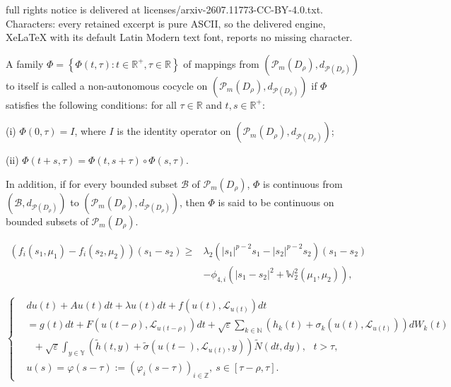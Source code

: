 \documentclass[10pt,a4paper]{amsart}
\begin{document}
full rights notice is delivered at licenses/arxiv-2607.11773-CC-BY-4.0.txt. Characters: every retained excerpt is pure ASCII, so the delivered engine, XeLaTeX with its default Latin Modern text font, reports no missing character.
\begin{definition}\label{def_ds}
  A family $\Phi =
                           \left\{\Phi(t, \tau): t \in \mathbb{R}^+, \tau \in \mathbb{R}
                           \right\}$
  of mappings from $\left( \mathcal{P}_m(D_{\rho}), d_{\mathcal{P}(D_{\rho})} \right)$
  to itself %
  is called a non-autonomous cocycle on $\left( \mathcal{P}_m(D_{\rho}), d_{\mathcal{P}(D_{\rho})} \right)$
  if $ \Phi $ satisfies 
  the following conditions:
   for all $\tau \in \mathbb{R}$ and $t,s \in \mathbb{R}^+$:

  (i) $\Phi(0, \tau) = I$,
      where $ I $ is the identity operator on $\left( \mathcal{P}_m(D_{\rho}), d_{\mathcal{P}(D_{\rho})} \right)$;

  (ii) $\Phi(t+s, \tau) = \Phi(t,s+\tau) \circ \Phi(s,\tau)$.

  In addition, if for every bounded subset $\mathscr{B}$ of $ \mathcal{P}_m (D_{\rho}) $,
  $ \Phi $ is continuous from  $\left( \mathscr{B} , d_{\mathcal{P}(D_{\rho})} \right)$
  to $\left( \mathcal{P}_m(D_{\rho}),  d_{\mathcal{P}(D_{\rho})} \right)$,
  then   $\Phi$ is 
  said to be continuous on bounded subsets of $ \mathcal{P}_m(D_{\rho}) $.
\end{definition}

 \begin{align}\label{f3}
    \left( f_i(s_1,\mu_1) - f_i(s_2,\mu_2) \right) (s_1 - s_2)
    \ge & \lambda_2 \left( |s_1|^{p-2} s_1 - |s_2|^{p-2} s_2 \right) ( s_1 - s_2 ) \nonumber\\
         & - \phi_{4,i} \left( |s_1 - s_2|^2 + \mathbb{W}_2^2(\mu_1,\mu_2) \right),
\end{align}

\begin{equation}\label{lmvlds-2}
  \left\{
    \begin{aligned}
       & d u (t)
         + Au(t) dt
         + \lambda u(t) dt
         + f(u(t),\mathcal{L}_{u(t)}) dt \\
       & = g(t) dt
           + F( u(t - \rho), \mathcal{L}_{u(t - \rho)} ) dt
           + \sqrt{\varepsilon}\sum_{k \in \mathbb{N} }
              \left( h_k(t) + \sigma_k(u(t), \mathcal{L}_{u(t)}) \right) dW_k(t)  \\
       & \ \ \
           + \sqrt{\varepsilon}
            \int_{y\in \mathbb{Y}}
                \left( \widetilde{h}(t,y) + \widetilde{\sigma}
                (u(t-), \mathcal{L}_{u(t)}, y)
                \right) \widetilde{N}(dt,dy), \ \ \ t > \tau, \\
       & u(s) = \varphi(s-\tau) := ( \varphi_i(s-\tau) )_{i \in \mathbb{Z}} ,\  s \in  [\tau-\rho, \tau].
    \end{aligned}
  \right.
\end{equation}
\end{document}

